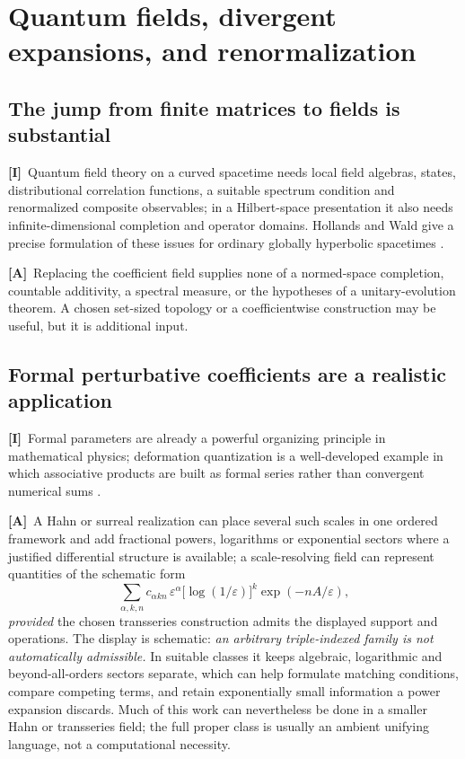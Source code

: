 \documentclass[11pt,letterpaper]{article}
\numberwithin{equation}{section}
\theoremstyle{definition}
\theoremstyle{remark}
\newcommand{\eps}{\varepsilon}
\newcommand{\TA}{\textcolor{TierA}{\textsf{\bfseries[A]}}}
\newcommand{\TI}{\textcolor{TierI}{\textsf{\bfseries[I]}}}
\begin{document}
\section{Quantum fields, divergent expansions, and renormalization}
\label{phys:sec:qft}

\subsection{The jump from finite matrices to fields is substantial}
\label{phys:sub:fields}

\TI\ Quantum field theory on a curved spacetime needs local field algebras,
states, distributional correlation functions, a suitable spectrum condition and
renormalized composite observables; in a Hilbert-space presentation it also
needs infinite-dimensional completion and operator domains. Hollands and Wald
give a precise formulation of these issues for ordinary globally hyperbolic
spacetimes \cite{phys:HW}.

\TA\ Replacing the coefficient field supplies none of a normed-space
completion, countable additivity, a spectral measure, or the hypotheses of a
unitary-evolution theorem. A chosen set-sized topology or a coefficientwise
construction may be useful, but it is additional input.

\subsection{Formal perturbative coefficients are a realistic application}
\label{phys:sub:formalpert}

\TI\ Formal parameters are already a powerful organizing principle in
mathematical physics; deformation quantization is a well-developed example in
which associative products are built as formal series rather than convergent
numerical sums \cite{phys:Kontsevich}.

\TA\ A Hahn or surreal realization can place several such scales in one ordered
framework and add fractional powers, logarithms or exponential sectors where a
justified differential structure is available; a scale-resolving field can
represent quantities of the schematic form
\begin{equation}\label{phys:eq:schematictrans}
\sum_{\alpha,k,n}c_{\alpha k n}\,
\eps^{\alpha}\bigl[\log(1/\eps)\bigr]^{k}\exp(-nA/\eps),
\end{equation}
\emph{provided} the chosen transseries construction admits the displayed
support and operations. The display is schematic: \emph{an arbitrary
triple-indexed family is not automatically admissible.} In suitable classes it
keeps algebraic, logarithmic and beyond-all-orders sectors separate, which can
help formulate matching conditions, compare competing terms, and retain
exponentially small information a power expansion discards. Much of this work
can nevertheless be done in a smaller Hahn or transseries field; the full
proper class is usually an ambient unifying language, not a computational
necessity.
\end{document}
